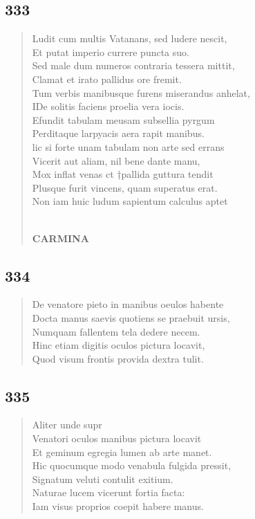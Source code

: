 \documentclass[11pt, a4paper]{report}
\begin{document}
            \subsection*{333}
      \begin{verse}
      Ludit cum multis Vatanans, sed ludere nescit, \\ Et putat imperio currere puncta suo. \\ Sed male dum numeros contraria tessera mittit, \\ Clamat et irato pallidus ore fremit. \\ Tum verbis manibusque furens miserandus anhelat, \\ IDe solitis faciens proelia vera iocis. \\ Efundit tabulam meusam subsellia pyrgum \\ Perditaque larpyacis aera rapit manibus. \\ lic si forte unam tabulam non arte sed errans \\ Vicerit aut aliam, nil bene dante manu, \\ Mox inflat venas ct †pallida guttura tendit \\ Plusque furit vincens, quam superatus erat. \\ Non iam huic ludum sapientum calculus aptet \\ 
        ﻿\pagebreak 
     \marginpar{[270]} \begin{center} \textbf{CARMINA} \end{center}
      \end{verse}
  
            \subsection*{334}
      \begin{verse}
      De venatore pieto in manibus oeulos habente \\ Docta manus saevis quotiens se praebuit ursis, \\ Numquam fallentem tela dedere necem. \\ Hinc etiam digitis oculos pictura locavit, \\ Quod visum frontis provida dextra tulit. \\ 
      \end{verse}
  
            \subsection*{335}
      \begin{verse}
      Aliter unde supr \\ Venatori oculos manibus pictura locavit \\ Et geminum egregia lumen ab arte manet. \\ Hic quocumque modo venabula fulgida pressit, \\ Signatum veluti contulit exitium. \\ Naturae lucem vicerunt fortia facta: \\ Iam visus proprios coepit habere manus. \\ 
      \end{verse}
  
\end{document}
